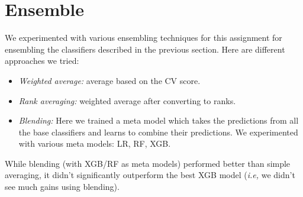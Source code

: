 \documentclass{article}
\begin{document}
\section{Ensemble}
We experimented with various ensembling techniques for this assignment for ensembling the classifiers described in the previous section. Here are different approaches we tried:
\begin{itemize}
\item \textit{Weighted average:} average based on the CV score.
\item \textit{Rank averaging:} weighted average after converting to ranks.
\item \textit{Blending:} Here we trained a meta model which takes the predictions from all the base classifiers and learns to combine their predictions. We experimented with various meta models: LR, RF, XGB.
\end{itemize}
While blending (with XGB/RF as meta models) performed better than simple averaging, it didn't significantly outperform the best XGB model (\textit{i.e,} we didn't see much gains using blending). 
\end{document}
